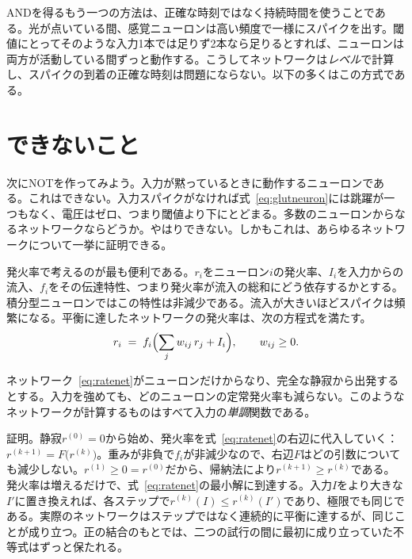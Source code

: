 ANDを得るもう一つの方法は、正確な時刻ではなく持続時間を使うことである。光が点いている間、感覚ニューロンは高い頻度で一様にスパイクを出す。閾値にとってそのような入力1本では足りず2本なら足りるとすれば、ニューロンは両方が活動している間ずっと動作する。こうしてネットワークは\emph{レベル}で計算し、スパイクの到着の正確な時刻は問題にならない。以下の多くはこの方式である。

\section{できないこと}

次にNOTを作ってみよう。入力が黙っているときに動作するニューロンである。これはできない。入力スパイクがなければ式~\eqref{eq:glutneuron}には跳躍が一つもなく、電圧はゼロ、つまり閾値より下にとどまる。多数のニューロンからなるネットワークならどうか。やはりできない。しかもこれは、あらゆるネットワークについて一挙に証明できる。

発火率で考えるのが最も便利である。$r_i$をニューロン$i$の発火率、$I_i$を入力からの流入、$f_i$をその伝達特性、つまり発火率が流入の総和にどう依存するかとする。積分型ニューロンではこの特性は非減少である。流入が大きいほどスパイクは頻繁になる。平衡に達したネットワークの発火率は、次の方程式を満たす。
\begin{equation}
r_i \;=\; f_i\Bigl(\sum_j w_{ij}\,r_j + I_i\Bigr), \qquad w_{ij}\ge 0 .
\label{eq:ratenet}
\end{equation}

\begin{keyblock}
\begin{proposition}[単調性]
\label{prop:monotone}
ネットワーク~\eqref{eq:ratenet}がニューロンだけからなり、完全な静寂から出発するとする。入力を強めても、どのニューロンの定常発火率も減らない。このようなネットワークが計算するものはすべて入力の\emph{単調}関数である。
\end{proposition}
\end{keyblock}

証明。静寂$r^{(0)}=0$から始め、発火率を式~\eqref{eq:ratenet}の右辺に代入していく：$r^{(k+1)}=F\bigl(r^{(k)}\bigr)$。重みが非負で$f_i$が非減少なので、右辺$F$はどの引数についても減少しない。$r^{(1)}\ge0=r^{(0)}$だから、帰納法により$r^{(k+1)}\ge r^{(k)}$である。発火率は増えるだけで、式~\eqref{eq:ratenet}の最小解に到達する。入力$I$をより大きな$I'$に置き換えれば、各ステップで$r^{(k)}(I)\le r^{(k)}(I')$であり、極限でも同じである。実際のネットワークはステップではなく連続的に平衡に達するが、同じことが成り立つ。正の結合のもとでは、二つの試行の間に最初に成り立っていた不等式はずっと保たれる。

